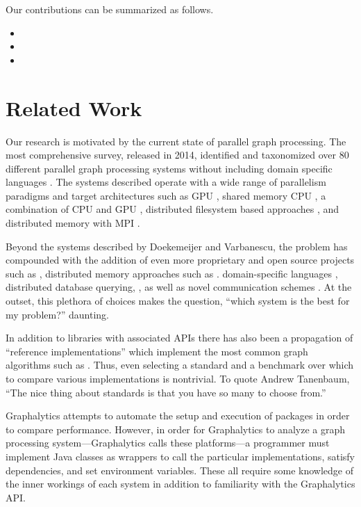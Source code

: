 \documentclass{llncs}
\begin{document}
Our contributions can be summarized as follows.
\begin{itemize}
\item
\item
\item
\end{itemize}

\section{Related Work}

Our research is motivated by the current state of parallel graph processing. The most comprehensive survey, released in 2014, identified and taxonomized over 80 different parallel graph processing systems without including domain specific languages \cite{Doekemeijer:2015:GPFSurvey}. The systems described operate with a wide range of parallelism paradigms and target architectures such as GPU \cite{Zhong:2014:Medusa, Kang:2009:Pegasus}, shared memory CPU \cite{Shun:2013:Ligra, kyrola:2012:Graphchi, Nguyen:2013:Galois}, a combination of CPU and GPU \cite{Gharaibeh:2012:Totem}, distributed filesystem based approaches \cite{Xin:2013:GraphX}, and distributed memory with MPI \cite{Gregor:2005:PBGL}.

Beyond the systems described by Doekemeijer and Varbanescu, the problem has compounded with the addition of even more proprietary and open source projects such as \cite{Cheramangalath:2015:Falcon,Perez:2015:Ringo}, distributed memory approaches such as \cite{Hong:2015:PGX}. domain-specific languages \cite{Hong:2012:GreenMarl}, distributed database querying, \cite{Rodriguez:2015:Gremlin}, as well as novel communication schemes \cite{Edmonds:2013:ActiveMessages}. At the outset, this plethora of choices makes the question, ``which system is the best for my problem?'' daunting.

In addition to libraries with associated APIs there has also been a propagation of ``reference implementations'' which implement the most common graph algorithms such as \cite{Beamer:2015:GAPBench, Nai:2015:Graphbig}. Thus, even selecting a standard and a benchmark over which to compare various implementations is nontrivial. To quote Andrew Tanenbaum, ``The nice thing about standards is that you have so many to choose from.''


Graphalytics \cite{Capota:2015:Graphalytics} attempts to automate the setup and execution of packages in order to compare performance. However, in order for Graphalytics to analyze a graph processing system---Graphalytics calls these platforms---a programmer must implement Java classes as wrappers to call the particular implementations, satisfy dependencies, and set environment variables. These all require some knowledge of the inner workings of each system in addition to familiarity with the Graphalytics API.
\end{document}

